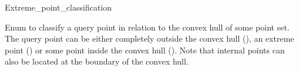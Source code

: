 \begin{ccRefEnum}{Extreme_point_classification}



{
Enum to classify a query point in relation to the convex hull of some point set. The query point can be either completely outside the convex hull (), an extreme point () or some point inside the convex hull (). Note that internal points can also be located at the boundary of the convex hull.
}

\ccSeeAlso


\end{ccRefEnum}
